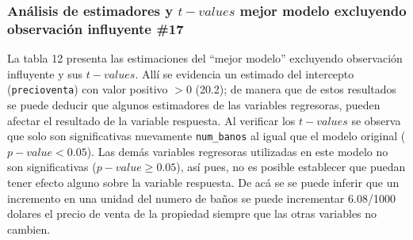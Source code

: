 \documentclass[
]{article}
\begin{document}
\hypertarget{anuxe1lisis-de-estimadores-y-t-values-mejor-modelo-excluyendo-observaciuxf3n-influyente-17}{%
\subsubsection{\texorpdfstring{Análisis de estimadores y \(t-values\)
mejor modelo excluyendo observación influyente
\#17}{Análisis de estimadores y t-values mejor modelo excluyendo observación influyente \#17}}\label{anuxe1lisis-de-estimadores-y-t-values-mejor-modelo-excluyendo-observaciuxf3n-influyente-17}}

La tabla 12 presenta las estimaciones del ``mejor modelo'' excluyendo
observación influyente y sus \(t-values\). Allí se evidencia un estimado
del intercepto (\texttt{precioventa}) con valor positivo \(> 0\) (20.2);
de manera que de estos resultados se puede deducir que algunos
estimadores de las variables regresoras, pueden afectar el resultado de
la variable respuesta. Al verificar los \(t-values\) se observa que solo
son significativas nuevamente \texttt{num\_banos} al igual que el modelo
original (\(p - value < 0.05\)). Las demás variables regresoras
utilizadas en este modelo no son significativas
(\(p - value \geq 0.05\)), así pues, no es posible establecer que puedan
tener efecto alguno sobre la variable respuesta. De acá se se puede
inferir que un incremento en una unidad del numero de baños se puede
incrementar 6.08/1000 dolares el precio de venta de la propiedad siempre
que las otras variables no cambien.
\end{document}
